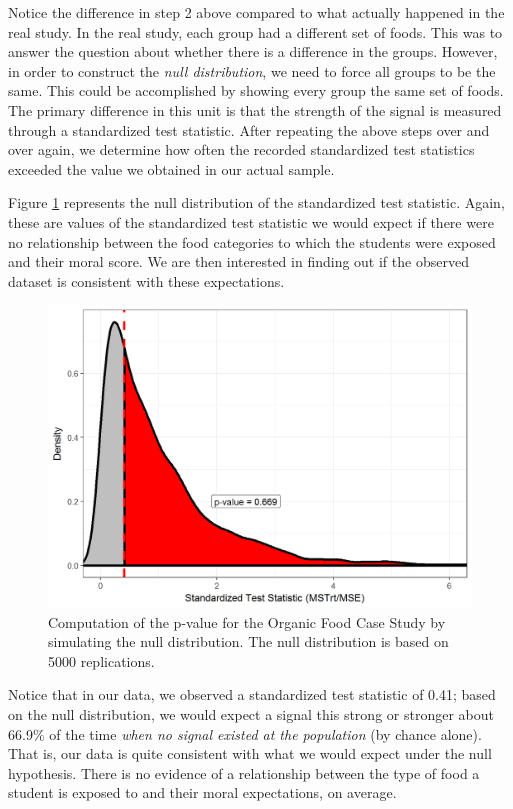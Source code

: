 \documentclass[]{book}
\theoremstyle{definition}
\theoremstyle{definition}
\theoremstyle{definition}
\theoremstyle{remark}
\begin{document}
Notice the difference in step 2 above compared to what actually happened
in the real study. In the real study, each group had a different set of
foods. This was to answer the question about whether there is a
difference in the groups. However, in order to construct the \emph{null
distribution}, we need to force all groups to be the same. This could be
accomplished by showing every group the same set of foods. The primary
difference in this unit is that the strength of the signal is measured
through a standardized test statistic. After repeating the above steps
over and over again, we determine how often the recorded standardized
test statistics exceeded the value we obtained in our actual sample.

Figure \ref{fig:anovateststat-pvalue} represents the null distribution
of the standardized test statistic. Again, these are values of the
standardized test statistic we would expect if there were no
relationship between the food categories to which the students were
exposed and their moral score. We are then interested in finding out if
the observed dataset is consistent with these expectations.

\begin{figure}

{\centering \includegraphics[width=0.8\linewidth]{./Images/anovateststat-pvalue-1} 

}

\caption{Computation of the p-value for the Organic Food Case Study by simulating the null distribution.  The null distribution is based on 5000 replications.}\label{fig:anovateststat-pvalue}
\end{figure}

Notice that in our data, we observed a standardized test statistic of
0.41; based on the null distribution, we would expect a signal this
strong or stronger about 66.9\% of the time \emph{when no signal existed
at the population} (by chance alone). That is, our data is quite
consistent with what we would expect under the null hypothesis. There is
no evidence of a relationship between the type of food a student is
exposed to and their moral expectations, on average.
\end{document}
